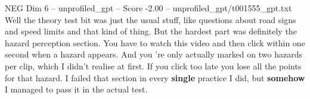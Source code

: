 \begin{textsample}{NEG Dim 6 – unprofiled\_gpt – Score -2.00 – unprofiled\_gpt/t001555\_gpt.txt}  \label{ex:f6_neg_030}
Well the theory test bit was just the usual stuff, like questions about road signs and speed limits and that kind of thing.
But the hardest part was definitely the hazard perception section.
You have to watch this video and then click within one second when a hazard appears.
And you ’re only actually marked on two hazards per clip, which I didn't realise at first.
If you click too late you lose all the points for that hazard.
I failed that section in every \textbf{single} practice I did, but \textbf{somehow} I managed to pass it in the actual test.

\end{textsample}
